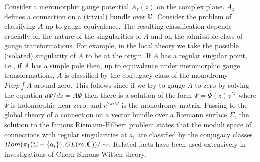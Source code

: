 Consider a meromorphic gauge potential $A_z(z)$ on the complex
plane. $A_z$ defines a connection on a (trivial) bundle over 
$\IC$. Consider the problem of classifying $A$ up to 
gauge equivalence. The resulting classification 
depends crucially on the nature of the singularities of $A$ and on 
the admissible class of gauge transformations. 
For example, in the 
local theory we take the possible (isolated) singularity
of $A$ to be at the origin. If $A$ has a regular singular 
point, i.e., if $A$ has a simple pole then,
up to equivalence under meromorphic gauge transformations,
$A$ is classified by the conjugacy class of the
monodromy $Pexp \int A$ around zero. This follows since
if we try to gauge $A$ to zero by solving the equation 
$d\Psi/dz= A \Psi$ then there is a solution of the form
$\Psi=\hat\Psi(z)z^M$ where $\hat\Psi$ is holomorphic
near zero, and
$e^{2\pi iM}$ is the monodromy matrix. Passing 
to the global theory of a connection on a vector bundle 
over a Riemann surface $\Sigma$, the solution to the famous
Riemann-Hilbert problem states that the moduli space of 
connections with regular singularities at $a_i$
are classified by the conjugacy classes
$Hom(\pi_1(\Sigma-\{a_i\}), GL(m,\IC) )/\sim$. 
Related facts
have been used 
extensively in investigations of Chern-Simons-Witten theory.

